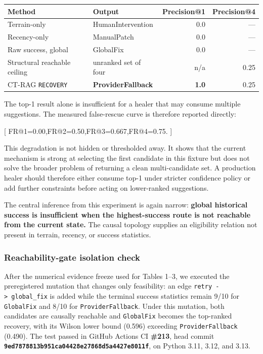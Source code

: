 \documentclass[
  11pt,
]{article}
\begin{document}
\begin{longtable}[]{@{}llrr@{}}
\toprule\noalign{}
Method & Output & Precision@1 & Precision@4 \\
\midrule\noalign{}
\endhead
\bottomrule\noalign{}
\endlastfoot
Terrain-only & HumanIntervention & 0.0 & --- \\
Recency-only & ManualPatch & 0.0 & --- \\
Raw success, global & GlobalFix & 0.0 & --- \\
Structural reachable ceiling & unranked set of four & n/a & 0.25 \\
CT-RAG \texttt{RECOVERY} & \textbf{ProviderFallback} & \textbf{1.0} & 0.25 \\
\end{longtable}

The top-1 result alone is insufficient for a healer that may consume
multiple suggestions. The measured false-rescue curve is therefore
reported directly:

{[} FR@1=0.00,\quad FR@2=0.50,\quad FR@3=0.667,\quad FR@4=0.75. {]}

This degradation is not hidden or thresholded away. It shows that the
current mechanism is strong at selecting the first candidate in this
fixture but does not solve the broader problem of returning a clean
multi-candidate set. A production healer should therefore either consume
top-1 under stricter confidence policy or add further constraints before
acting on lower-ranked suggestions.

The central inference from this experiment is again narrow:
\textbf{global historical success is insufficient when the
highest-success route is not reachable from the current state.} The
causal topology supplies an eligibility relation not present in terrain,
recency, or success statistics.

\subsubsection{Reachability-gate isolation
check}\label{reachability-gate-isolation-check}

After the numerical evidence freeze used for Tables 1--3, we executed
the preregistered mutation that changes only feasibility: an edge
\texttt{retry\ -\textgreater{}\ global\_fix} is added while the
terminal success statistics remain 9/10 for \texttt{GlobalFix} and 8/10
for \texttt{ProviderFallback}. Under this mutation, both candidates are
causally reachable and \texttt{GlobalFix} becomes the top-ranked
recovery, with its Wilson lower bound (0.596) exceeding
\texttt{ProviderFallback} (0.490). The test passed in GitHub Actions CI
\textbf{\#213}, head commit
\textbf{\texttt{9ed7878813b951ca04428e27868d5a4427e8011f}}, on Python
3.11, 3.12, and 3.13.
\end{document}
